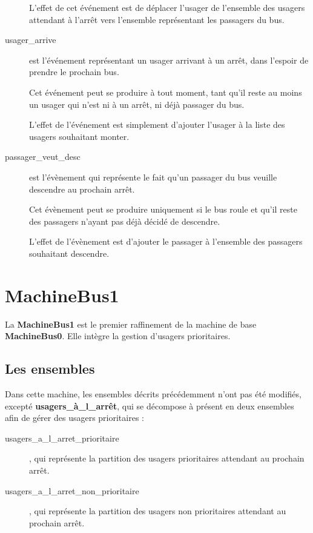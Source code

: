 \documentclass[a4paper,titlepage]{report}
\begin{document}
\begin{description}
			L'effet de cet événement est de déplacer l'usager de l'ensemble des usagers attendant à l'arrêt vers l'ensemble représentant les passagers du bus.\\
		
			\item[usager\_arrive] est l'événement représentant un usager arrivant à un arrêt, dans l'espoir de prendre le prochain bus.
			
			Cet événement peut se produire à tout moment, tant qu'il reste au moins un usager qui n'est ni à un arrêt, ni déjà passager du bus.
			
			L'effet de l'événement est simplement d'ajouter l'usager à la liste des usagers souhaitant monter.\\
			
			\item[passager\_veut\_desc] est l'évènement qui représente le fait qu'un passager du bus veuille descendre au prochain arrêt.
			
			Cet évènement peut se produire uniquement si le bus roule et qu'il reste des passagers n'ayant pas déjà décidé de descendre.
			
			L'effet de l'évènement est d'ajouter le passager à l'ensemble des passagers souhaitant descendre.\\
		\end{description}
		
\section{MachineBus1}
	La \textbf{MachineBus1} est le premier raffinement de la machine de base \textbf{MachineBus0}. Elle intègre la gestion d'usagers prioritaires.\\
		
	\subsection{Les ensembles}
		Dans cette machine, les ensembles décrits précédemment n'ont pas été modifiés, excepté \textbf{usagers\_à\_l\_arrêt}, qui se décompose à présent en deux ensembles afin de gérer des usagers prioritaires :
		 	
		\begin{description}
			\item[usagers\_a\_l\_arret\_prioritaire], qui représente la partition des usagers prioritaires attendant au prochain arrêt.
			\item[usagers\_a\_l\_arret\_non\_prioritaire], qui représente la partition des usagers non prioritaires attendant au prochain arrêt.\\
		\end{description}
				
\end{document}
